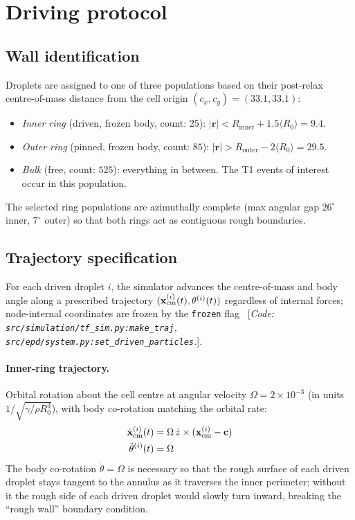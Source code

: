 \documentclass[aps,pre,twocolumn,floatfix,longbibliography]{revtex4-2}
\newcommand{\Rinner}{R_{\mathrm{inner}}}
\newcommand{\Router}{R_{\mathrm{outer}}}
\begin{document}
\section{Driving protocol}
\label{sec:driving}

\subsection{Wall identification}
Droplets are assigned to one of three populations based on their
post-relax centre-of-mass distance from the cell origin
$(c_x, c_y) = (33.1, 33.1)$:
\begin{itemize}
\item \emph{Inner ring} (driven, frozen body, count: $25$):
  $|\mathbf r| < \Rinner + 1.5 \langle R_0 \rangle = 9.4$.
\item \emph{Outer ring} (pinned, frozen body, count: $85$):
  $|\mathbf r| > \Router - 2 \langle R_0 \rangle = 29.5$.
\item \emph{Bulk} (free, count: $525$): everything in between.  The
  T1 events of interest occur in this population.
\end{itemize}
The selected ring populations are azimuthally complete (max angular
gap $26^\circ$ inner, $7^\circ$ outer) so that both rings act as
contiguous rough boundaries.

\subsection{Trajectory specification}
For each driven droplet $i$, the simulator advances the
centre-of-mass and body angle along a prescribed trajectory
$(\mathbf x_{\rm cm}^{(i)}(t), \theta^{(i)}(t))$ regardless of
internal forces; node-internal coordinates are frozen by the
\texttt{frozen} flag~ [\textit{Code: \texttt{src/simulation/tf\_sim.py:make\_traj},
\texttt{src/epd/system.py:set\_driven\_particles}.}].

\paragraph*{Inner-ring trajectory.}  Orbital rotation about the
cell centre at angular velocity $\Omega = 2 \times 10^{-3}$ (in units
$1/\sqrt{\gamma/\rho R_0^3}$), with body co-rotation matching the
orbital rate:
\begin{align}
\dot{\mathbf x}_{\rm cm}^{(i)}(t) &= \Omega \, \hat z
   \times (\mathbf x_{\rm cm}^{(i)} - \mathbf c) \\
\dot\theta^{(i)}(t) &= \Omega
\end{align}
The body co-rotation $\dot\theta = \Omega$ is necessary so that
the rough surface of each driven droplet stays tangent to the
annulus as it traverses the inner perimeter; without it the rough
side of each driven droplet would slowly turn inward, breaking the
``rough wall'' boundary condition.
\end{document}
